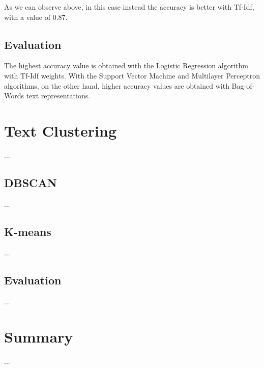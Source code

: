 \documentclass[fleqn,10pt]{SelfArx} %
\begin{document}
As we can observe above, in this case instead the accuracy is better with Tf-Idf, with a value of 0.87.

\subsection{Evaluation}
The highest accuracy value is obtained with the Logistic Regression algorithm with Tf-Idf weights. With the Support Vector Machine and Multilayer Perceptron algorithms, on the other hand, higher accuracy values are obtained with Bag-of-Words text representations.

\section{Text Clustering}
...

\subsection{DBSCAN}
...

\subsection{K-means}
...

\subsection{Evaluation}
...

\section{Summary}
...


\nocite{*}
\printbibliography
\end{document}

